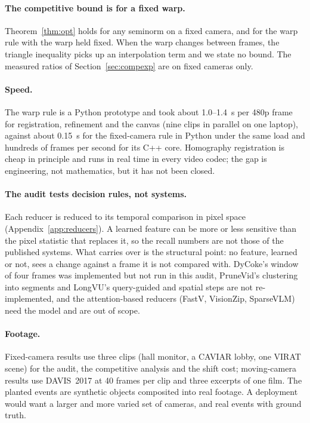 \paragraph{The competitive bound is for a fixed warp.} Theorem~\ref{thm:opt} holds for any seminorm on a fixed camera, and for the warp rule with the warp held fixed. When the warp changes between frames, the triangle inequality picks up an interpolation term and we state no bound. The measured ratios of Section~\ref{sec:compexp} are on fixed cameras only.

\paragraph{Speed.} The warp rule is a Python prototype and took about 1.0--1.4~s per 480p frame for registration, refinement and the canvas (nine clips in parallel on one laptop), against about 0.15~s for the fixed-camera rule in Python under the same load and hundreds of frames per second for its C++ core. Homography registration is cheap in principle and runs in real time in every video codec; the gap is engineering, not mathematics, but it has not been closed.

\paragraph{The audit tests decision rules, not systems.} Each reducer is reduced to its temporal comparison in pixel space (Appendix~\ref{app:reducers}). A learned feature can be more or less sensitive than the pixel statistic that replaces it, so the recall numbers are not those of the published systems. What carries over is the structural point: no feature, learned or not, sees a change against a frame it is not compared with. DyCoke's window of four frames was implemented but not run in this audit, PruneVid's clustering into segments and LongVU's query-guided and spatial steps are not re-implemented, and the attention-based reducers (FastV, VisionZip, SparseVLM) need the model and are out of scope.

\paragraph{Footage.} Fixed-camera results use three clips (hall monitor, a CAVIAR lobby, one VIRAT scene) for the audit, the competitive analysis and the shift cost; moving-camera results use DAVIS~2017 at 40 frames per clip and three excerpts of one film. The planted events are synthetic objects composited into real footage. A deployment would want a larger and more varied set of cameras, and real events with ground truth.
